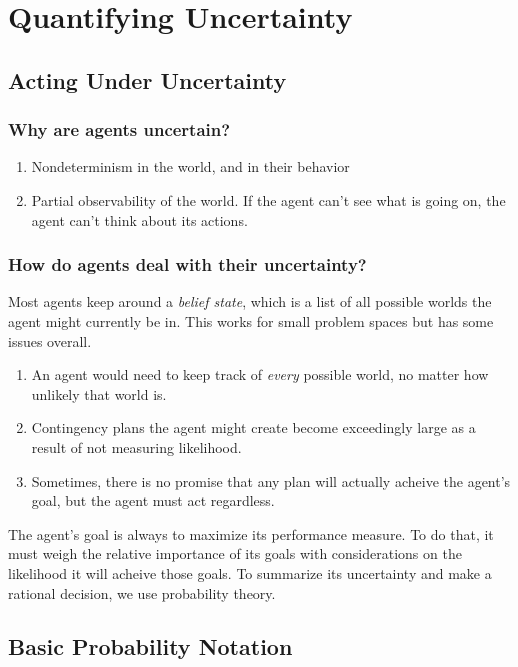\documentclass[10pt, twocolumn]{article}
\begin{document}
\section*{Quantifying Uncertainty}

\subsection*{Acting Under Uncertainty}

\subsubsection*{Why are agents uncertain?}
\begin{enumerate}
    \itemsep -4pt
    \item Nondeterminism in the world, and in their behavior
    \item Partial observability of the world.  If the agent can't see what is
          going on, the agent can't think about its actions.
\end{enumerate}

\subsubsection*{How do agents deal with their uncertainty?}
Most agents keep around a \textit{belief state}, which is a list of all possible
worlds the agent might currently be in.  This works for small problem spaces
but has some issues overall.
\begin{enumerate}
    \itemsep -4pt
    \item An agent would need to keep track of \textit{every} possible world, no
          matter how unlikely that world is.
    \item Contingency plans the agent might create become exceedingly large as
          a result of not measuring likelihood.
    \item Sometimes, there is no promise that any plan will actually acheive
          the agent's goal, but the agent must act regardless.
\end{enumerate}

The agent's goal is always to maximize its performance measure.  To do that,
it must weigh the relative importance of its goals with considerations on the
likelihood it will acheive those goals.  To summarize its uncertainty and make
a rational decision, we use probability theory.

\subsection*{Basic Probability Notation}
\end{document}
